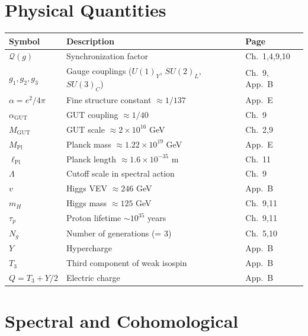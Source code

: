\documentclass[11pt,a4paper,openright]{book}
\theoremstyle{plain}
\theoremstyle{definition}
\begin{document}
\section*{Physical Quantities}

\begin{tabular}{lll}
\textbf{Symbol} & \textbf{Description} & \textbf{Page} \\
\hline
$\mathcal{Q}(g)$ & Synchronization factor & Ch.~1,4,9,10 \\
$g_1, g_2, g_3$ & Gauge couplings ($U(1)_Y$, $SU(2)_L$, $SU(3)_C$) & Ch.~9, App.~B \\
$\alpha = e^2/4\pi$ & Fine structure constant $\approx 1/137$ & App.~E \\
$\alpha_{\mathrm{GUT}}$ & GUT coupling $\approx 1/40$ & Ch.~9 \\
$M_{\mathrm{GUT}}$ & GUT scale $\approx 2 \times 10^{16}$ GeV & Ch.~2,9 \\
$M_{\mathrm{Pl}}$ & Planck mass $\approx 1.22 \times 10^{19}$ GeV & App.~E \\
$\ell_{\mathrm{Pl}}$ & Planck length $\approx 1.6 \times 10^{-35}$ m & Ch.~11 \\
$\Lambda$ & Cutoff scale in spectral action & Ch.~9 \\
$v$ & Higgs VEV $\approx 246$ GeV & App.~B \\
$m_H$ & Higgs mass $\approx 125$ GeV & Ch.~9,11 \\
$\tau_p$ & Proton lifetime $\sim 10^{35}$ years & Ch.~9,11 \\
$N_g$ & Number of generations (= 3) & Ch.~5,10 \\
$Y$ & Hypercharge & App.~B \\
$T_3$ & Third component of weak isospin & App.~B \\
$Q = T_3 + Y/2$ & Electric charge & App.~B \\
\end{tabular}

\section*{Spectral and Cohomological}
\end{document}
